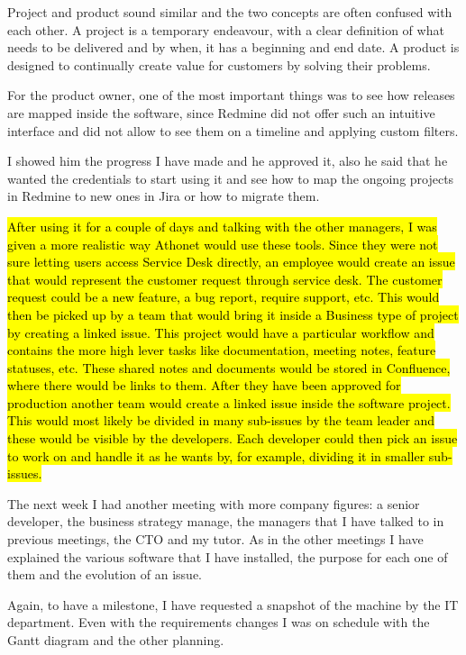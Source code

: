	Project and product sound similar and the two concepts are often confused with each other.
	A project is a temporary endeavour, with a clear definition of what needs to be delivered and by when, it has a beginning and end date.
	A product is designed to continually create value for customers by solving their problems.
	
	For the product owner, one of the most important things was to see how releases are mapped inside the software, since Redmine did not offer such an intuitive interface and did not allow to see them on a timeline and applying custom filters.
	
	I showed him the progress I have made and he approved it, also he said that he wanted the credentials to start using it and see how to map the ongoing projects in Redmine to new ones in Jira or how to migrate them.
	
	\hl{After using it for a couple of days and talking with the other managers, I was given a more realistic way Athonet would use these tools.
	Since they were not sure letting users access Service Desk directly, an employee would create an issue that would represent the customer request through service desk.
	The customer request could be a new feature, a bug report, require support, etc.
	This would then be picked up by a team that would bring it inside a Business type of project by creating a linked issue.
	This project would have a particular workflow and contains the more high lever tasks like documentation, meeting notes, feature statuses, etc.
	These shared notes and documents would be stored in Confluence, where there would be links to them.
	After they have been approved for production another team would create a linked issue inside the software project.
	This would most likely be divided in many sub-issues by the team leader and these would be visible by the developers.
	Each developer could then pick an issue to work on and handle it as he wants by, for example, dividing it in smaller sub-issues.}
	
	The next week I had another meeting with more company figures: a senior developer, the business strategy manage, the managers that I have talked to in previous meetings, the CTO and my tutor.
	As in the other meetings I have explained the various software that I have installed, the purpose for each one of them and the evolution of an issue.
	
	Again, to have a milestone, I have requested a snapshot of the machine by the IT department.
	Even with the requirements changes I was on schedule with the Gantt diagram and the other planning.

